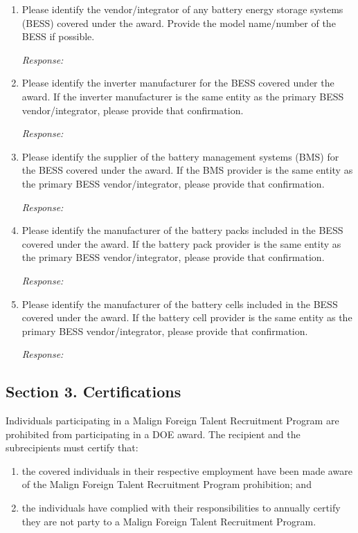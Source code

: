\documentclass[
]{article}
\providecommand{\tightlist}{%
  \setlength{\itemsep}{0pt}\setlength{\parskip}{0pt}}
\begin{document}
\begin{enumerate}
\def\labelenumi{\arabic{enumi}.}
\item
  Please identify the vendor/integrator of any battery energy storage
  systems (BESS) covered under the award. Provide the model name/number
  of the BESS if possible.

  \emph{Response:}
\item
  Please identify the inverter manufacturer for the BESS covered under
  the award. If the inverter manufacturer is the same entity as the
  primary BESS vendor/integrator, please provide that confirmation.

  \emph{Response:}
\item
  Please identify the supplier of the battery management systems (BMS)
  for the BESS covered under the award. If the BMS provider is the same
  entity as the primary BESS vendor/integrator, please provide that
  confirmation.

  \emph{Response:}
\item
  Please identify the manufacturer of the battery packs included in the
  BESS covered under the award. If the battery pack provider is the same
  entity as the primary BESS vendor/integrator, please provide that
  confirmation.

  \emph{Response:}
\item
  Please identify the manufacturer of the battery cells included in the
  BESS covered under the award. If the battery cell provider is the same
  entity as the primary BESS vendor/integrator, please provide that
  confirmation.

  \emph{Response:}
\end{enumerate}

\subsection{Section 3. Certifications}\label{section-3-certifications}

Individuals participating in a Malign Foreign Talent Recruitment Program
are prohibited from participating in a DOE award. The recipient and the
subrecipients must certify that:

\begin{enumerate}
\def\labelenumi{\arabic{enumi}.}
\tightlist
\item
  the covered individuals in their respective employment have been made
  aware of the Malign Foreign Talent Recruitment Program prohibition;
  and
\item
  the individuals have complied with their responsibilities to annually
  certify they are not party to a Malign Foreign Talent Recruitment
  Program.
\end{enumerate}
\end{document}
